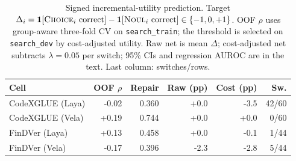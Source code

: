 \begin{table}[H]
\centering
\scriptsize
\caption{Signed incremental-utility prediction. Target
$\Delta_i=\mathbf{1}[\textsc{Choice}_i\text{ correct}]-
\mathbf{1}[\textsc{Noul}_i\text{ correct}]\in\{-1,0,+1\}$. OOF $\rho$ uses
group-aware three-fold CV on \texttt{search\_train}; the threshold is selected
on \texttt{search\_dev} by cost-adjusted utility. Raw net is mean $\Delta$;
cost-adjusted net subtracts $\lambda=0.05$ per switch; 95\% CIs and regression
AUROC are in the text. Last column: switches/rows.}
\label{tab:predictability}
\begin{tabular}{@{}lrrrrr@{}}
\toprule
Cell & OOF $\rho$ & Repair & Raw (pp) & Cost (pp) & Sw. \\
\midrule
CodeXGLUE (Laya) & -0.02 & 0.360 & +0.0 & -3.5 & 42/60 \\
CodeXGLUE (Vela) & +0.19 & 0.744 & +0.0 & +0.0 & 0/60 \\
FinDVer (Laya) & +0.13 & 0.458 & +0.0 & -0.1 & 1/44 \\
FinDVer (Vela) & -0.17 & 0.396 & -2.3 & -2.8 & 5/44 \\
\bottomrule
\end{tabular}
\end{table}
